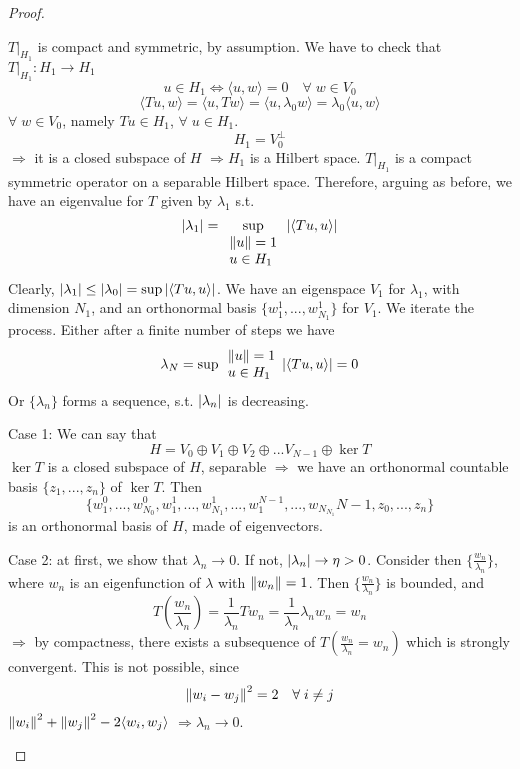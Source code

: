 \begin{proof}
\begin{itemize}
        \(T|_{H_1}\) is compact and symmetric, by assumption. We have to check that \(T|_{H_1}: H_1 \to H_1\)
        \[
            u \in H_1 \iff \langle u, w\rangle = 0 \quad \forall\; w \in V_0
        \]
        \[
            \langle Tu, w\rangle = \langle u, Tw\rangle = \langle u, \lambda_0 w\rangle = \lambda_0 \langle u, w\rangle
        \]
        \(\forall\; w \in V_0\), namely \(Tu \in H_1\), \(\forall\; u \in H_1\). 
        \[
            H_1 = V_0^\perp
        \]
        \(\Rightarrow\) it is a closed subspace of \(H\) \(\Rightarrow H_1\) is a Hilbert space.
        \(T|_{H_1}\) is a compact symmetric operator on a separable Hilbert space. Therefore, arguing as before, we have an eigenvalue for \(T\) given by \(\lambda_1\) s.t. 
        \[
            \abs{\lambda_1} = \sup_{
            \begin{array}{l}
                \norm{u} = 1 \\
                u \in H_1    
            \end{array}}
            \abs{\langle Tu, u\rangle}
        \]
        Clearly, \(\abs{\lambda_1} \leq \abs{\lambda_0} = \sup \abs{\langle Tu, u\rangle}\).
        We have an eigenspace \(V_1 \) for \(\lambda_1\), with dimension \(N_1\), and an orthonormal basis \(\{w_1^1, ..., w_{N_1}^1\}\) for \(V_1\). We iterate the process. 
        Either after a finite number of steps we have
        \[
            \lambda_N = \sup{\begin{array}{l}
                \norm{u} = 1 \\
                u \in H_1    
            \end{array}} \abs{\langle Tu, u\rangle} = 0
        \]
        Or \(\{\lambda_n\}\) forms a sequence, s.t. \(\abs{\lambda_n}\) is decreasing.

        Case 1: We can say that 
        \[
            H = V_0 \oplus V_1 \oplus V_2 \oplus ... V_{N-1} \oplus \ker T
        \]
        \(\ker T\) is a closed subspace of \(H\), separable \(\Rightarrow\) we have an orthonormal countable basis \(\{z_1, ... , z_n\}\) of \(\ker T\). Then
        \[
            \{w_1^0, ..., w_{N_0}^0, w_1^1, ..., w_{N_1}^1, ..., w_1^{N-1}, ..., w_{N_{N_1}}{N-1}, z_0, ..., z_n \} 
        \]
        is an orthonormal basis of \(H\), made of eigenvectors.

        Case 2: at first, we show that \(\lambda_n \to 0\). If not, \(\abs{\lambda_n} \to \eta > 0\). 
        Consider then \(\{\frac{w_n}{\lambda_n}\}\), where \(w_n\) is an eigenfunction of \(\lambda\) with \(\norm{w_n}=1\). Then \(\{\frac{w_n}{\lambda_n}\}\) is bounded, and
        \[
            T(\frac{w_n}{\lambda_n}) = \frac{1}{\lambda_n} T w_n = \frac{1}{\lambda_n} \lambda_n w_n = w_n
        \]
        \(\Rightarrow\) by compactness, there exists a subsequence of \(T(\frac{w_n}{\lambda_n}= w_n)\) which is strongly convergent.
        This is not possible, since
        \[
            \norm{w_i - w_j}^2 = 2 \quad \forall\; i \neq j
        \]
        \(\norm{w_i}^2 + \norm{w_j}^2 -2\langle w_i, w_j\rangle\) \(\Rightarrow \lambda_n \to 0\).


\end{itemize}
\end{proof}
